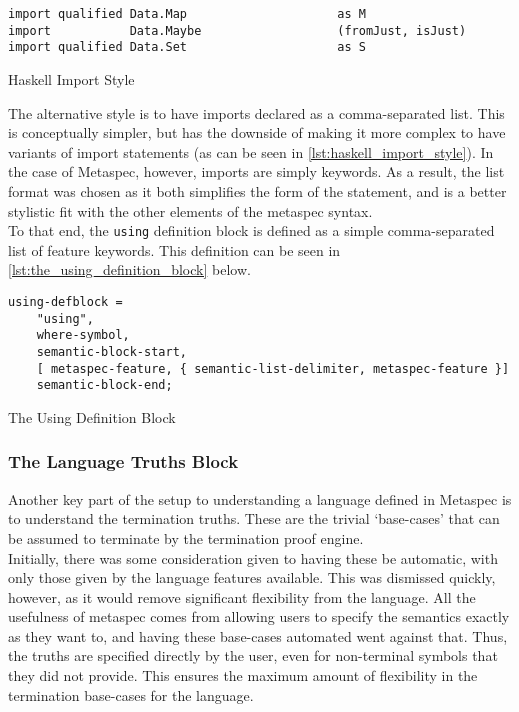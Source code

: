 \begin{listing}[!htb]
\begin{verbatim}
import qualified Data.Map                     as M
import           Data.Maybe                   (fromJust, isJust)
import qualified Data.Set                     as S
\end{verbatim}
\caption{Haskell Import Style}
\label{lst:haskell_import_style}
\end{listing}

The alternative style is to have imports declared as a comma-separated list. 
This is conceptually simpler, but has the downside of making it more complex to have variants of import statements (as can be seen in \autoref{lst:haskell_import_style}).
In the case of Metaspec, however, imports are simply keywords. 
As a result, the list format was chosen as it both simplifies the form of the statement, and is a better stylistic fit with the other elements of the metaspec syntax. \\

To that end, the \texttt{using} definition block is defined as a simple comma-separated list of feature keywords.
This definition can be seen in \autoref{lst:the_using_definition_block} below.

\begin{listing}[!htb]
\begin{verbatim}
using-defblock =
    "using",
    where-symbol,
    semantic-block-start,
    [ metaspec-feature, { semantic-list-delimiter, metaspec-feature }]
    semantic-block-end;
\end{verbatim}
\caption{The Using Definition Block}
\label{lst:the_using_definition_block}
\end{listing}


\subsubsection{The Language Truths Block} %
\label{ssub:the_language_truths_block}
Another key part of the setup to understanding a language defined in Metaspec is to understand the termination truths.
These are the trivial `base-cases' that can be assumed to terminate by the termination proof engine.\\

Initially, there was some consideration given to having these be automatic, with only those given by the language features available.
This was dismissed quickly, however, as it would remove significant flexibility from the language. 
All the usefulness of metaspec comes from allowing users to specify the semantics exactly as they want to, and having these base-cases automated went against that.
Thus, the truths are specified directly by the user, even for non-terminal symbols that they did not provide. 
This ensures the maximum amount of flexibility in the termination base-cases for the language.\\

